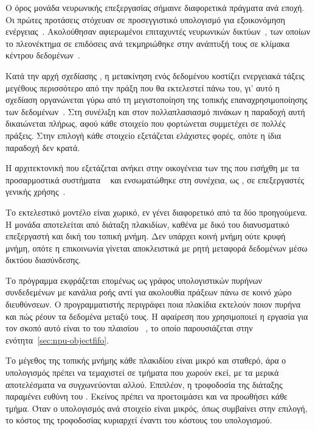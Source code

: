 Ο όρος μονάδα νευρωνικής επεξεργασίας σήμαινε διαφορετικά πράγματα ανά εποχή.
Οι πρώτες προτάσεις στόχευαν σε προσεγγιστικό υπολογισμό για εξοικονόμηση
ενέργειας~\cite{palmer2014npu,esmaeilzadeh2012}. Ακολούθησαν αφιερωμένοι
επιταχυντές νευρωνικών δικτύων~\cite{chen2014diannao}, των οποίων το
πλεονέκτημα σε επιδόσεις ανά  τεκμηριώθηκε στην ανάπτυξή τους σε
κλίμακα κέντρου δεδομένων~\cite{jouppi2017tpu}.

Κατά την αρχή σχεδίασης , η μετακίνηση ενός δεδομένου κοστίζει
ενεργειακά τάξεις μεγέθους περισσότερο από την πράξη που θα εκτελεστεί πάνω
του, γι' αυτό η σχεδίαση οργανώνεται γύρω από τη μεγιστοποίηση της τοπικής
επαναχρησιμοποίησης των δεδομένων~\cite{chen2016eyeriss}. Στη συνέλιξη και στον
πολλαπλασιασμό πινάκων η παραδοχή αυτή δικαιώνεται πλήρως, αφού κάθε στοιχείο
που φορτώνεται συμμετέχει σε πολλές πράξεις. Στην επιλογή  κάθε
στοιχείο εξετάζεται ελάχιστες φορές, οπότε η ίδια παραδοχή δεν κρατά.

Η αρχιτεκτονική που εξετάζεται ανήκει στην οικογένεια των  της
 που εισήχθη με τα προσαρμοστικά συστήματα
~\cite{amd2021versal} και ενσωματώθηκε στη συνέχεια, ως ,
σε επεξεργαστές γενικής χρήσης~\cite{amd2024xdna}.

Το εκτελεστικό μοντέλο είναι χωρικό, εν γένει διαφορετικό από τα δύο
προηγούμενα. Η μονάδα αποτελείται από διάταξη πλακιδίων, καθένα με δικό του
διανυσματικό επεξεργαστή και δική του τοπική μνήμη. Δεν υπάρχει κοινή μνήμη
ούτε κρυφή μνήμη, οπότε η επικοινωνία γίνεται αποκλειστικά με ρητή μεταφορά
δεδομένων μέσω δικτύου διασύνδεσης.

Το πρόγραμμα εκφράζεται επομένως ως γράφος υπολογιστικών πυρήνων συνδεδεμένων
με κανάλια ροής αντί για ακολουθία πράξεων πάνω σε κοινό χώρο διευθύνσεων. Ο
προγραμματιστής περιγράφει ποια πλακίδια εκτελούν ποιον πυρήνα και πώς ρέουν τα
δεδομένα μεταξύ τους. Η αφαίρεση που χρησιμοποιεί η εργασία για τον σκοπό αυτό
είναι το  του πλαισίου ~\cite{mliraie}, το οποίο
παρουσιάζεται στην ενότητα~\ref{sec:npu-objectfifo}.

Το μέγεθος της τοπικής μνήμης κάθε πλακιδίου είναι μικρό και σταθερό, άρα ο
υπολογισμός πρέπει να τεμαχιστεί σε τμήματα που χωρούν εκεί, με τα μερικά
αποτελέσματα να συγχωνεύονται αλλού. Επιπλέον, η τροφοδοσία της διάταξης
παραμένει ευθύνη του . Εκείνος πρέπει να προετοιμάσει και να προωθήσει
κάθε τμήμα. Όταν ο υπολογισμός ανά στοιχείο είναι μικρός, όπως συμβαίνει στην
επιλογή, το κόστος της τροφοδοσίας κυριαρχεί έναντι του κόστους του
υπολογισμού.

